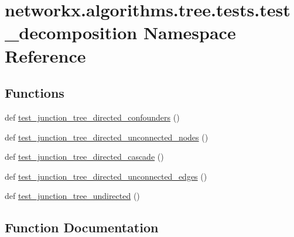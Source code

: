 \hypertarget{namespacenetworkx_1_1algorithms_1_1tree_1_1tests_1_1test__decomposition}{}\section{networkx.\+algorithms.\+tree.\+tests.\+test\+\_\+decomposition Namespace Reference}
\label{namespacenetworkx_1_1algorithms_1_1tree_1_1tests_1_1test__decomposition}
\subsection*{Functions}
\begin{DoxyCompactItemize}
\item 
def \hyperlink{namespacenetworkx_1_1algorithms_1_1tree_1_1tests_1_1test__decomposition_a6dc8c22658c6c27ae12055217cc57800}{test\+\_\+junction\+\_\+tree\+\_\+directed\+\_\+confounders} ()
\item 
def \hyperlink{namespacenetworkx_1_1algorithms_1_1tree_1_1tests_1_1test__decomposition_aaa8639996bdea774d32a351390e9f6e1}{test\+\_\+junction\+\_\+tree\+\_\+directed\+\_\+unconnected\+\_\+nodes} ()
\item 
def \hyperlink{namespacenetworkx_1_1algorithms_1_1tree_1_1tests_1_1test__decomposition_aa9d1e5ba3fe78be15ac688a5426934cf}{test\+\_\+junction\+\_\+tree\+\_\+directed\+\_\+cascade} ()
\item 
def \hyperlink{namespacenetworkx_1_1algorithms_1_1tree_1_1tests_1_1test__decomposition_a589e2339f3c7871ae00dce70ce6d8278}{test\+\_\+junction\+\_\+tree\+\_\+directed\+\_\+unconnected\+\_\+edges} ()
\item 
def \hyperlink{namespacenetworkx_1_1algorithms_1_1tree_1_1tests_1_1test__decomposition_adb4fdf8a37dd0f7a461c5e48f0043ee2}{test\+\_\+junction\+\_\+tree\+\_\+undirected} ()
\end{DoxyCompactItemize}


\subsection{Function Documentation}
\mbox{\label{namespacenetworkx_1_1algorithms_1_1tree_1_1tests_1_1test__decomposition_aa9d1e5ba3fe78be15ac688a5426934cf}} 
